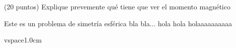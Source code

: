 \question [1] (20 puntos) Explique prevemente qué tiene que ver el momento magnético 

\begin{solution}
Este es un problema de simetría esférica bla bla...
hola hola holaaaaaaaaaa


\end{solution}

vspace{1.0cm}